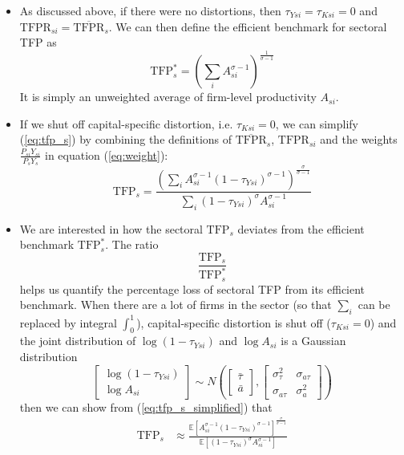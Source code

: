 \documentclass[12pt]{article}
\begin{document}
\begin{itemize}
		\item As discussed above, if there were no distortions, then $\tau_{Ysi} = \tau_{Ksi} = 0$ and $\text{TFPR}_{si} = \overline{\text{TFPR}}_s$. We can then define the efficient benchmark for sectoral TFP as
	\begin{equation}
		\text{TFP}_s^* = \left(\sum_i A_{si}^{\sigma -1} \right)^{\frac{1}{\sigma-1}}
	\end{equation}
		It is simply an unweighted average of firm-level productivity $A_{si}$. 
	\item If we shut off capital-specific distortion, i.e. $\tau_{Ksi} = 0$, we can simplify (\ref{eq:tfp_s}) by combining the definitions of $\overline{\text{TFPR}}_s$, $\text{TFPR}_{si}$ and the weights $\frac{P_{si}Y_{si}}{P_s Y_s}$ in equation (\ref{eq:weight}):
	\begin{equation} \label{eq:tfp_s_simplified}
		\text{TFP}_s = \frac{\left(\sum_i A_{si}^{\sigma -1} (1-\tau_{Ysi})^{\sigma-1}\right)^{\frac{\sigma}{\sigma-1}}}{\sum_{i} (1-\tau_{Ysi})^{\sigma} A_{si}^{\sigma -1}}
	\end{equation} 
	\item We are interested in how the sectoral $\text{TFP}_s$ deviates from the efficient benchmark $\text{TFP}_s^*$. The ratio 
	\[\frac{\text{TFP}_s}{\text{TFP}_s^*}\] 
	helps us quantify the percentage loss of sectoral TFP from its efficient benchmark. When there are a lot of firms in the sector (so that $\sum_i$ can be replaced by integral $\int_0^1$), capital-specific distortion is shut off ($\tau_{Ksi} = 0$) and the joint distribution of $\log (1-\tau_{Ysi})$ and $\log A_{si}$ is a Gaussian distribution 
	\[\begin{bmatrix}
		\log (1-\tau_{Ysi}) \\ \log A_{si}
	\end{bmatrix} \sim N \left(
\begin{bmatrix}
	\bar{\tau} \\ \bar{a} 
\end{bmatrix}, \begin{bmatrix}
\sigma^2_{\tau} & \sigma_{a\tau} \\
\sigma_{a\tau} & \sigma^2_{a}
\end{bmatrix}
\right)\]
then we can show from (\ref{eq:tfp_s_simplified}) that
\begin{align*}
	\text{TFP}_s & \approx \frac{\mathbb{E}\left[A_{si}^{\sigma -1} (1-\tau_{Ysi})^{\sigma-1}\right]^{\frac{\sigma}{\sigma-1}}}{\mathbb{E}[(1-\tau_{Ysi})^\sigma A_{si}^{\sigma -1}]} \\

\end{align*}
\end{itemize}
\end{document}
